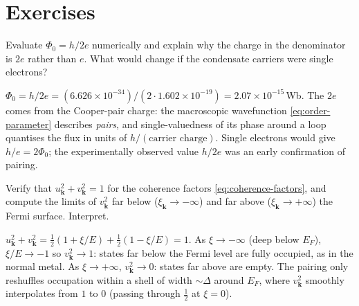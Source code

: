 \section*{Exercises}

\begin{exercise}
Evaluate $\Phi_0=h/2e$ numerically and explain why the charge in the
denominator is $2e$ rather than $e$. What would change if the
condensate carriers were single electrons?
\begin{solution}
$\Phi_0=h/2e=(6.626\times10^{-34})/(2\cdot1.602\times10^{-19})
=2.07\times10^{-15}\,$Wb. The $2e$ comes from the Cooper-pair charge:
the macroscopic wavefunction \cref{eq:order-parameter} describes
\emph{pairs}, and single-valuedness of its phase around a loop
quantises the flux in units of $h/(\text{carrier charge})$. Single
electrons would give $h/e=2\Phi_0$; the experimentally observed value
$h/2e$ was an early confirmation of pairing.
\end{solution}
\end{exercise}

\begin{exercise}
Verify that $u_{\mathbf k}^2+v_{\mathbf k}^2=1$ for the coherence
factors \cref{eq:coherence-factors}, and compute the limits of
$v_{\mathbf k}^2$ far below ($\xi_{\mathbf k}\to-\infty$) and far above
($\xi_{\mathbf k}\to+\infty$) the Fermi surface. Interpret.
\begin{solution}
$u_{\mathbf k}^2+v_{\mathbf k}^2
=\tfrac12(1+\xi/E)+\tfrac12(1-\xi/E)=1$. As
$\xi\to-\infty$ (deep below $E_F$), $\xi/E\to-1$ so
$v_{\mathbf k}^2\to1$: states far below the Fermi level are fully
occupied, as in the normal metal. As $\xi\to+\infty$,
$v_{\mathbf k}^2\to0$: states far above are empty. The pairing only
reshuffles occupation within a shell of width $\sim\Delta$ around
$E_F$, where $v_{\mathbf k}^2$ smoothly interpolates from $1$ to $0$
(passing through $\tfrac12$ at $\xi=0$).
\end{solution}
\end{exercise}

